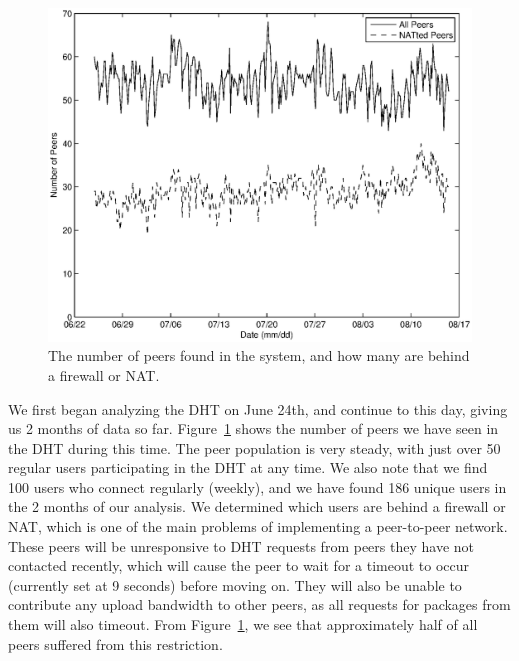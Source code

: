 \documentclass[conference]{IEEEtran}
\begin{document}
\begin{figure}
\centering
\includegraphics[width=\columnwidth]{AptP2PWalker-peers.eps}
\caption{The number of peers found in the system, and how many are
behind a firewall or NAT.}
\label{walker_peers}
\end{figure}

We first began analyzing the DHT on June 24th, and continue to this
day, giving us 2 months of data so far. Figure~\ref{walker_peers}
shows the number of peers we have seen in the DHT during this time.
The peer population is very steady, with just over 50 regular users
participating in the DHT at any time. We also note that we find 100
users who connect regularly (weekly), and we have found 186 unique
users in the 2 months of our analysis. We determined which users are
behind a firewall or NAT, which is one of the main problems of
implementing a peer-to-peer network. These peers will be
unresponsive to DHT requests from peers they have not contacted
recently, which will cause the peer to wait for a timeout to occur
(currently set at 9 seconds) before moving on. They will also be
unable to contribute any upload bandwidth to other peers, as all
requests for packages from them will also timeout. From
Figure~\ref{walker_peers}, we see that approximately half of all
peers suffered from this restriction.
\end{document}
